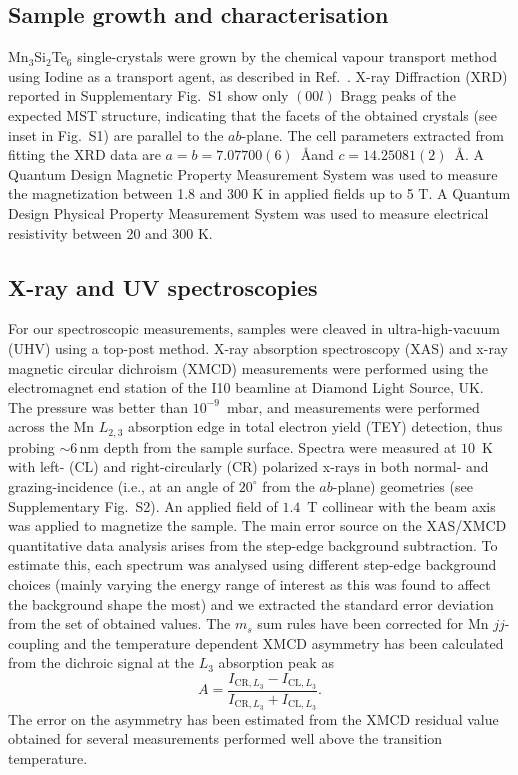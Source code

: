\documentclass[preprint,amsmath,amssymb,aps,nofootinbib,superscriptaddress]{revtex4-2}
\begin{document}
\subsection{Sample growth and characterisation} Mn$_3$Si$_2$Te$_6$ single-crystals were grown by the chemical vapour transport method using Iodine as a transport agent, as described in Ref.~\cite{JSSC1986Vincent}. X-ray Diffraction (XRD) reported in Supplementary Fig.~S1 show only $(00l)$ Bragg peaks of the expected MST structure, indicating that the facets of the obtained crystals (see inset in Fig.~S1) are parallel to the $ab$-plane. The cell parameters extracted from fitting the XRD data are $a = b = 7.07700(6)$~\AA and $c = 14.25081(2)$~\AA. A Quantum Design Magnetic Property Measurement System was used to measure the magnetization between 1.8 and 300 K in applied fields up to 5 T. A Quantum Design Physical Property Measurement System was used to measure electrical resistivity between 20 and 300 K.

\subsection{X-ray and UV spectroscopies} 
For our spectroscopic measurements, samples were cleaved in ultra-high-vacuum (UHV) using a top-post method. X-ray absorption spectroscopy (XAS) and x-ray magnetic circular dichroism (XMCD) measurements were performed using the electromagnet end station of the I10 beamline at Diamond Light Source, UK. The pressure was better than $10^{-9}$~mbar, and measurements were performed across the Mn $L_{2,3}$ absorption edge in total electron yield (TEY) detection, thus probing $\sim\!6$\,nm depth from the sample surface. Spectra were measured at $10$~K with left- (CL) and right-circularly (CR) polarized x-rays in both normal- and grazing-incidence (i.e., at an angle of $20^\circ$ from the $ab$-plane) geometries (see Supplementary Fig.~S2). An applied field of $1.4$~T collinear with the beam axis was applied to magnetize the sample. The main error source on the XAS/XMCD quantitative data analysis arises from the step-edge background subtraction. To estimate this, each spectrum was analysed using different step-edge background choices (mainly varying the energy range of interest as this was found to affect the background shape the most) and we extracted the standard error deviation from the set of obtained values. The $m_s$ sum rules have been corrected for Mn $jj$-coupling \cite{PRB2005Edmonds} and the temperature dependent XMCD asymmetry has been calculated from the dichroic signal at the $L_3$ absorption peak as
\[A=\frac{I_{\mathrm{CR},L_3}-I_{\mathrm{CL},L_3}}{I_{\mathrm{CR},L_3}+I_{\mathrm{CL},L_3}}.\] The error on the asymmetry has been estimated from the XMCD residual value obtained for several measurements performed well above the transition temperature.
\end{document}
